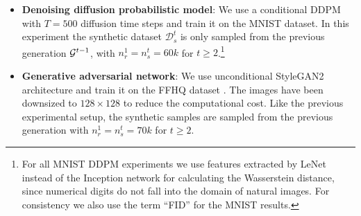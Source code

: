 \documentclass{article}
\begin{document}
\begin{itemize}
    \item \textbf{Denoising diffusion probabilistic model}: We use a conditional DDPM \cite{ddpm} with $T = 500$ diffusion time steps and train it on the MNIST dataset. In this experiment the synthetic dataset $\mathcal{D}_s^t$ is only sampled from the previous generation $\mathcal{G}^{t-1}$, with $n_r^1 = n_s^t = 60k$ for $t \ge 2$.\footnote{For all MNIST DDPM experiments we use features extracted by LeNet \cite{726791} instead of the Inception network for calculating the Wasserstein distance, since numerical digits do not fall into the domain of natural images. For consistency we also use the term ``FID'' for the MNIST results.}
    
    \item \textbf{Generative adversarial network}: We use unconditional StyleGAN2 architecture \cite{Karras2019stylegan2} and train it on the FFHQ dataset \cite{kass1997geometrical}. The images have been downsized to $128\times128$ to reduce the computational cost. Like the previous experimental setup, the synthetic samples are sampled from the previous generation with $n_r^1 = n_s^t = 70k$ for $t \ge 2$.
\end{itemize}
\end{document}
